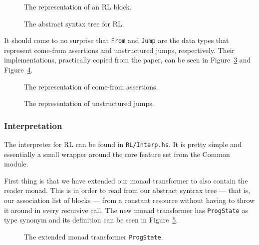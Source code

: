  \begin{figure}[h]
  
  \caption{The representation of an RL block.}\label{fig:rlblock}
\end{figure}

\begin{figure}[h]
  
  \caption{The abstract syntax tree for RL.}\label{fig:rlast}
\end{figure}

It should come to no surprise that \texttt{From} and \texttt{Jump} are the data types that represent come-from assertions and unstructured jumps, respectively. Their implementations, practically copied from the paper, can be seen in Figure~\ref{fig:from} and Figure~\ref{fig:jump}.

\begin{figure}[h]
  
  \caption{The representation of come-from assertions.}\label{fig:from}
\end{figure}

\begin{figure}[H]
  
  \caption{The representation of unstructured jumps.}\label{fig:jump}
\end{figure}

\subsubsection{Interpretation}
The interpreter for RL can be found in \texttt{RL/Interp.hs}. It is pretty simple and essentially a small wrapper around the core feature set from the Common module.

First thing is that we have extended our monad transformer to also contain the reader monad. This is in order to read from our abstract syntrax tree --- that is, our association list of blocks --- from a constant resource without having to throw it around in every recursive call. The new monad transformer has \texttt{ProgState} as type synonym and its definition can be seen in Figure~\ref{fig:progstate}.

\begin{figure}[h]
  
  \caption{The extended monad transformer \texttt{ProgState}.}\label{fig:progstate}
\end{figure}

